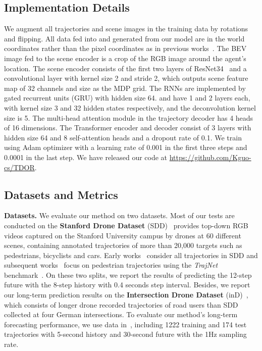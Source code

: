 \documentclass[10pt,twocolumn,letterpaper]{article}
\begin{document}
\subsection{Implementation Details}
We augment all trajectories and scene images in the training data by  rotations and flipping. All data fed into and generated from our model are in the world coordinates rather than the pixel coordinates as in previous works~\cite{Sadeghian2018Trajnet,deo2020trajectory,mangalam2020not}. The BEV image fed to the scene encoder is a  crop of the RGB image around the agent's location. The scene encoder  consists of the first two layers of ResNet34~\cite{he2016deep} and a convolutional layer with kernel size 2 and stride 2, which outputs scene feature map of 32 channels and size  as the MDP grid. The RNNs are implemented by gated recurrent units (GRU) with hidden size 64.  and  have 1 and 2 layers each, with kernel size 3 and 32 hidden states respectively, and the deconvolution kernel size is 5. The multi-head attention module in the trajectory decoder has 4 heads of 16 dimensions. The Transformer encoder and decoder consist of 3 layers with hidden size 64 and 8 self-attention heads and a dropout rate of 0.1. We train using Adam optimizer with a learning rate of 0.001 in the first three steps and 0.0001 in the last step. We have released our code at \url{https://github.com/Kguo-cs/TDOR}. 

\subsection{Datasets and Metrics}

\textbf{Datasets.} We evaluate our method on two datasets. Most of our tests are conducted on the
\textbf{Stanford Drone Dataset} (SDD)~\cite{robicquet2016learning} provides top-down RGB videos captured on the Stanford University campus by drones at 60 different scenes, containing annotated trajectories of more than 20,000 targets such as pedestrians, bicyclists and cars. Early works~\cite{sadeghian2019sophie,dendorfer2020goal,liang2020garden} consider all trajectories in SDD and subsequent works~\cite{marchetti2020mantra,mangalam2020not,mangalam2021goals,zhao2021you} focus on pedestrian trajectories using the \textit{TrajNet} benchmark~\cite{Sadeghian2018Trajnet}. On these two splits,
we report the results of predicting the 12-step future with the 8-step history with 0.4 seconds step interval. Besides, we report our long-term prediction results on the \textbf{Intersection Drone Dataset} (inD)~\cite{inDdataset}, which consists of longer drone recorded trajectories of road users than SDD collected at four German intersections. To evaluate our method's long-term forecasting performance, we use data in~\cite{mangalam2021goals}, including 1222 training and 174 test trajectories with 5-second history and 30-second future with the 1Hz sampling rate.  
\end{document}
